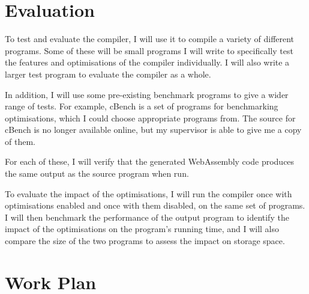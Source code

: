 \documentclass[12pt,a4paper]{article}
\begin{document}
\section*{Evaluation}

To test and evaluate the compiler, I will use it to compile a variety of different programs. Some of these will be small programs I will write to specifically test the features and optimisations of the compiler individually. I will also write a larger test program to evaluate the compiler as a whole.

In addition, I will use some pre-existing benchmark programs to give a wider range of tests. For example, cBench is a set of programs for benchmarking optimisations, which I could choose appropriate programs from. The source for cBench is no longer available online, but my supervisor is able to give me a copy of them.

For each of these, I will verify that the generated WebAssembly code produces the same output as the source program when run.

To evaluate the impact of the optimisations, I will run the compiler once with optimisations enabled and once with them disabled, on the same set of programs. I will then benchmark the performance of the output program to identify the impact of the optimisations on the program's running time, and I will also compare the size of the two programs to assess the impact on storage space.

\section*{Work Plan}

\newcommand\workpackagenumber{\stepcounter{workpackages}\arabic{workpackages}}
\end{document}
